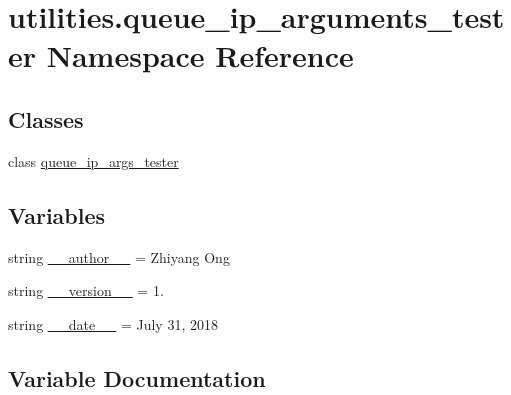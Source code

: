 \hypertarget{namespaceutilities_1_1queue__ip__arguments__tester}{}\section{utilities.\+queue\+\_\+ip\+\_\+arguments\+\_\+tester Namespace Reference}
\label{namespaceutilities_1_1queue__ip__arguments__tester}
\subsection*{Classes}
\begin{DoxyCompactItemize}
\item 
class \hyperlink{classutilities_1_1queue__ip__arguments__tester_1_1queue__ip__args__tester}{queue\+\_\+ip\+\_\+args\+\_\+tester}
\end{DoxyCompactItemize}
\subsection*{Variables}
\begin{DoxyCompactItemize}
\item 
string \hyperlink{namespaceutilities_1_1queue__ip__arguments__tester_a4613e6fdf0e66646ab9e6b2431f60697}{\+\_\+\+\_\+author\+\_\+\+\_\+} = \textquotesingle{}Zhiyang Ong\textquotesingle{}
\item 
string \hyperlink{namespaceutilities_1_1queue__ip__arguments__tester_a37d1fc5c2ed863dec0b8ce969bc4ac4c}{\+\_\+\+\_\+version\+\_\+\+\_\+} = \textquotesingle{}1.\textquotesingle{}
\item 
string \hyperlink{namespaceutilities_1_1queue__ip__arguments__tester_abb3d4e36e816d047434e26922c0e28fe}{\+\_\+\+\_\+date\+\_\+\+\_\+} = \textquotesingle{}July 31, 2018\textquotesingle{}
\end{DoxyCompactItemize}


\subsection{Variable Documentation}
\hypertarget{namespaceutilities_1_1queue__ip__arguments__tester_a4613e6fdf0e66646ab9e6b2431f60697}{}
